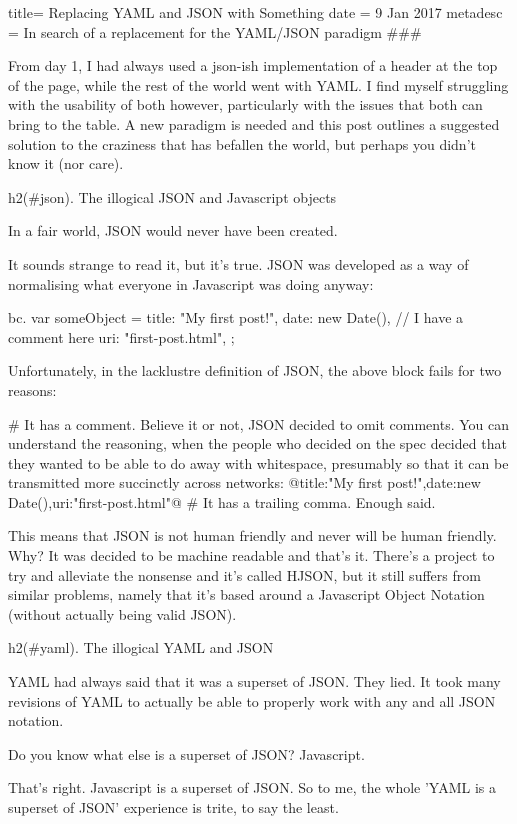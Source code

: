 title= Replacing YAML and JSON with Something
date = 9 Jan 2017
metadesc = In search of a replacement for the YAML/JSON paradigm
###

From day 1, I had always used a json-ish implementation of a header at the top of the page, while the rest of the world went with YAML. I find myself struggling with the usability of both however, particularly with the issues that both can bring to the table. A new paradigm is needed and this post outlines a suggested solution to the craziness that has befallen the world, but perhaps you didn't know it (nor care).

h2(#json). The illogical JSON and Javascript objects

In a fair world, JSON would never have been created.

It sounds strange to read it, but it's true. JSON was developed as a way of normalising what everyone in Javascript was doing anyway:

bc. var someObject = {
	title: "My first post!",
	date: new Date(), // I have a comment here
	uri: "first-post.html",
};

Unfortunately, in the lacklustre definition of JSON, the above block fails for two reasons:

# It has a comment. Believe it or not, JSON decided to omit comments. You can understand the reasoning, when the people who decided on the spec decided that they wanted to be able to do away with whitespace, presumably so that it can be transmitted more succinctly across networks: @{title:"My first post!",date:new Date(),uri:"first-post.html"}@
# It has a trailing comma. Enough said.

This means that JSON is not human friendly and never will be human friendly. Why? It was decided to be machine readable and that's it. There's a project to try and alleviate the nonsense and it's called HJSON, but it still suffers from similar problems, namely that it's based around a Javascript Object Notation (without actually being valid JSON).

h2(#yaml). The illogical YAML and JSON

YAML had always said that it was a superset of JSON. They lied. It took many revisions of YAML to actually be able to properly work with any and all JSON notation.

Do you know what else is a superset of JSON? Javascript.

That's right. Javascript is a superset of JSON. So to me, the whole 'YAML is a superset of JSON' experience is trite, to say the least.

